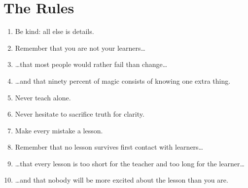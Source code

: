 \chapter*{The Rules}

\begin{enumerate}

\item Be kind: all else is details.

\item Remember that you are not your learners{\ldots}

\item {\ldots}that most people would rather fail than change{\ldots}

\item {\ldots}and that ninety percent of magic consists of knowing one extra thing.

\item Never teach alone.

\item Never hesitate to sacrifice truth for clarity.

\item Make every mistake a lesson.

\item Remember that no lesson survives first contact with learners{\ldots}

\item {\ldots}that every lesson is too short for the teacher and too long for the learner{\ldots}

\item {\ldots}and that nobody will be more excited about the lesson than you are.

\end{enumerate}
